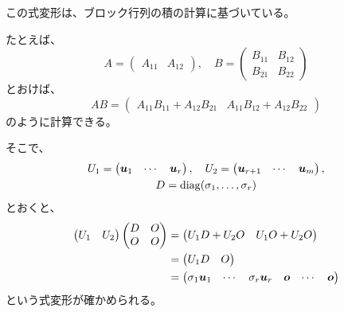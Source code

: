 \documentclass[../../../topic_linear-algebra]{subfiles}
\begin{document}
\begin{handout}
  この式変形は、ブロック行列の積の計算に基づいている。
  
  たとえば、
  \begin{equation*}
    A = \begin{pmatrix}
      A_{11} & A_{12} 
    \end{pmatrix}, \quad
    B = \begin{pmatrix}
      B_{11} & B_{12} \\
      B_{21} & B_{22}
    \end{pmatrix}
  \end{equation*}
  とおけば、
  \begin{equation*}
    AB = \begin{pmatrix}
      A_{11}B_{11} + A_{12}B_{21} & A_{11}B_{12} + A_{12}B_{22}
    \end{pmatrix}
  \end{equation*}
  のように計算できる。
  
  \br
  
  そこで、
  \begin{gather*}
    U_1 = \begin{pmatrix}
      \vb*{u}_1 & \cdots & \vb*{u}_r
    \end{pmatrix}, \quad
    U_2 = \begin{pmatrix}
      \vb*{u}_{r+1} & \cdots & \vb*{u}_m
    \end{pmatrix}, \\
    D = \operatorname{diag}(\sigma_1, \ldots, \sigma_r)
  \end{gather*}
  とおくと、
  \begin{align*}
    \begin{pmatrix}
      U_1 & U_2
    \end{pmatrix} \begin{pmatrix}
      D & O \\
      O & O
    \end{pmatrix} & = \begin{pmatrix}
      U_1D + U_2O & U_1O + U_2O
    \end{pmatrix} \\
    & = \begin{pmatrix}
      U_1D & O
    \end{pmatrix} \\
    & = \begin{pmatrix}
      \sigma_1\vb*{u}_1 & \cdots & \sigma_r\vb*{u}_r & \vb*{o} & \cdots & \vb*{o}
    \end{pmatrix}
  \end{align*}
  という式変形が確かめられる。
\end{handout}
\end{document}
